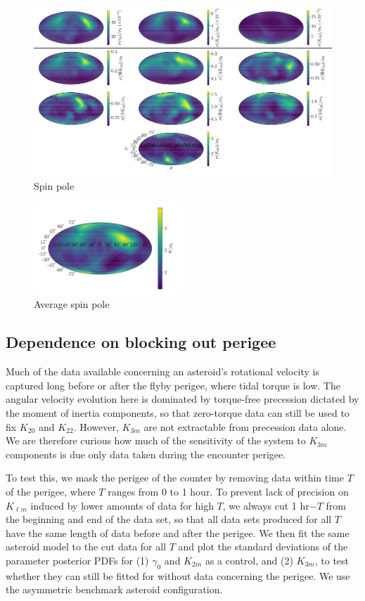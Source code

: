 \documentclass{aastex631}
\begin{document}
\begin{figure}
  \centering
  \includegraphics[width=\textwidth]{spin-pole.pdf}
  \caption{Spin pole}
  \label{fig:spin-pole}
\end{figure}
\begin{figure}
  \centering
  \includegraphics[width=0.5\textwidth]{spin-pole-avg.pdf}
  \caption{Average spin pole}
  \label{fig:spin-pole-avg}
\end{figure}


\subsection{Dependence on blocking out perigee}
\label{sec:block-perigee}
Much of the data available concerning an asteroid's rotational velocity is captured long before or after the flyby perigee, where tidal torque is low. The angular velocity evolution here is dominated by torque-free precession dictated by the moment of inertia components, so that zero-torque data can still be used to fix $K_{20}$ and $K_{22}$. However, $K_{3m}$ are not extractable from precession data alone. We are therefore curious how much of the sensitivity of the system to $K_{3m}$ components is due only data taken during the encounter perigee.

To test this, we mask the perigee of the counter by removing data within time $T$ of the perigee, where $T$ ranges from 0 to 1 hour. To prevent lack of precision on $K_{\ell m}$ induced by lower amounts of data for high $T$, we always cut 1 hr$-T$ from the beginning and end of the data set, so that all data sets produced for all $T$ have the same length of data before and after the perigee. We then fit the same asteroid model to the cut data for all $T$ and plot the standard deviations of the parameter posterior PDFs for (1) $\gamma_0$ and $K_{2m}$ as a control, and (2) $K_{3m}$, to test whether they can still be fitted for without data concerning the perigee. We use the asymmetric benchmark asteroid configuration.
\end{document}
